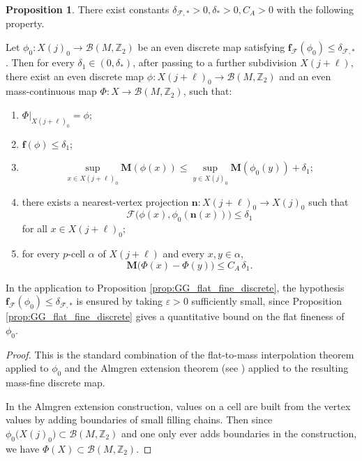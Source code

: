 \documentclass[12pt,english]{article}
\theoremstyle{definition}
\newtheorem{proposition}[theorem]{Proposition}
\begin{document}
\begin{proposition}\label{prop:interpolation_package_B}
There exist constants $\delta_{\mathcal F,\ast}>0, \delta_\ast>0, C_A>0$
with the following property.

Let $\phi_0:X(j)_0\to \mathcal B(M,\mathbb{Z}_2)$ be an even discrete map satisfying $\mathbf f_{\mathcal F}(\phi_0)\le \delta_{\mathcal F,\ast}$. Then for every $\delta_1\in (0,\delta_\ast)$, after passing to a further subdivision
$X(j+\ell)$, there exist an even discrete map $\phi:X(j+\ell)_0\to \mathcal B(M,\mathbb{Z}_2)$ and an even mass-continuous map $\Phi:X\to \mathcal B(M,\mathbb{Z}_2)$, such that:
\begin{enumerate}
\item[(i)] $\Phi|_{X(j+\ell)_0}=\phi$;
\item[(ii)] $\mathbf f(\phi)\le \delta_1$;
\item[(iii)]
\[
\sup_{x\in X(j+\ell)_0}\mathbf M(\phi(x))
\le \sup_{y\in X(j)_0}\mathbf M(\phi_0(y))+\delta_1;
\]
\item[(iv)] there exists a nearest-vertex projection $\mathbf n:X(j+\ell)_0\to X(j)_0$ such that
\[
\mathcal F\bigl(\phi(x),\phi_0(\mathbf n(x))\bigr)\le \delta_1
\]
for all $x\in X(j+\ell)_0$;
\item[(v)] for every $p$-cell $\alpha$ of $X(j+\ell)$ and every $x,y\in \alpha$,
\[
\mathbf M\bigl(\Phi(x)-\Phi(y)\bigr)\le C_A\,\delta_1.
\]
\end{enumerate}
\end{proposition}

In the application to Proposition \ref{prop:GG_flat_fine_discrete}, the hypothesis
$\mathbf f_{\mathcal F}(\phi_0)\le \delta_{\mathcal F,\ast}$ is ensured by taking $\varepsilon>0$ sufficiently
small, since Proposition \ref{prop:GG_flat_fine_discrete} gives a quantitative bound on the flat fineness of $\phi_0$.

\begin{proof}
This is the standard combination of the flat-to-mass interpolation theorem applied to $\phi_0$ and the Almgren extension theorem (see \cite{MarquesNevesInfinite, MarquesNevesWillmore, Zhou2015}) applied to the resulting mass-fine discrete map.

In the Almgren extension construction, values on a cell are built from the vertex values by adding boundaries of small filling chains. Then since $\phi_0\bigl(X(j)_0\bigr) \subset \mathcal B(M,\mathbb{Z}_2)$ and one only ever adds boundaries in the construction, we have $\Phi(X) \subset \mathcal B(M,\mathbb{Z}_2)$.
\end{proof}
\end{document}

